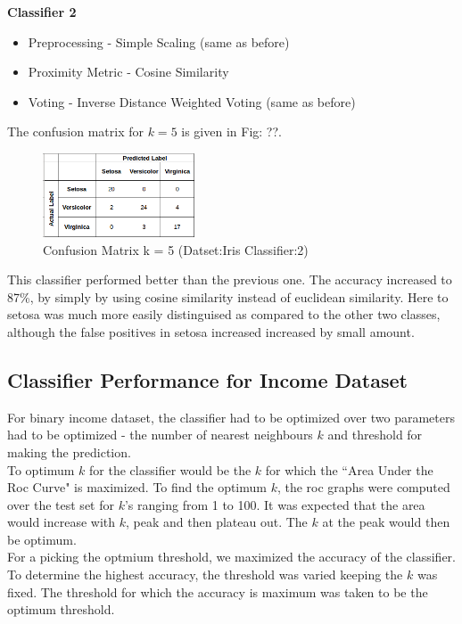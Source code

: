 	\textbf{Classifier 2}
	\begin{itemize}
		\item Preprocessing - Simple Scaling (same as before)
		\item Proximity Metric - Cosine Similarity
		\item Voting - Inverse Distance Weighted Voting (same as before)
	\end{itemize}
	The confusion matrix for $k = 5$ is given in Fig: ??.
	\begin{figure}[h]
		\label{fig:iris_consine_k=5}
		\caption{Confusion Matrix k = 5 (Datset:Iris Classifier:2)}
		\centering
		\includegraphics[width=0.4\textwidth]{images/iris_cosine_k=5.png}
	\end{figure}
	This classifier performed better than the previous one. The accuracy increased to 87\%, by simply by using cosine similarity instead of euclidean similarity. Here to setosa was much more easily distinguised as compared to the other two classes, although the false positives in setosa increased increased by small amount.\\

\subsection{Classifier Performance for Income Dataset}
For binary income dataset, the classifier had to be optimized over two parameters had to be optimized - the number of nearest neighbours $k$ and threshold for making the prediction. \\
To optimum $k$ for the classifier would be the $k$ for which the ``Area Under the Roc Curve" is maximized. To find the optimum $k$, the roc graphs were computed over the test set for $k$'s ranging from 1 to 100. It was expected that the area would increase with $k$, peak and then plateau out. The $k$ at the peak would then be optimum.\\
For a picking the optmium threshold, we maximized the accuracy of the classifier. To determine the highest accuracy, the threshold was varied keeping the $k$ was fixed. The threshold for which the accuracy is maximum was taken to be the optimum threshold.


